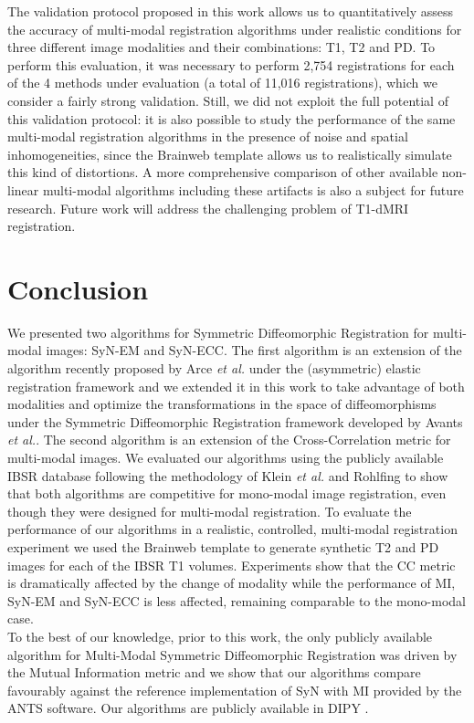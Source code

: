 The validation protocol proposed in this work allows us to quantitatively assess the accuracy of multi-modal registration algorithms under realistic conditions for three different image modalities and their combinations: T1, T2 and PD. To perform this evaluation, it was necessary to perform 2,754 registrations for each of the 4 methods under evaluation (a total of 11,016 registrations), which we consider a fairly strong validation. Still, we did not exploit the full potential of this validation protocol: it is also possible to study the performance of the same multi-modal registration algorithms in the presence of noise and spatial inhomogeneities, since the Brainweb template allows us to realistically simulate this kind of distortions. A more comprehensive comparison of other available non-linear multi-modal algorithms including these artifacts is also a subject for future research. Future work will address the challenging problem of T1-dMRI registration.


\section{Conclusion}
We presented two algorithms for Symmetric Diffeomorphic Registration for multi-modal images: SyN-EM and SyN-ECC. The first algorithm is an extension of the algorithm recently proposed by Arce {\it et al.}\cite{Arce-santana2014} under the (asymmetric) elastic registration framework and we extended it in this work to take advantage of both modalities and optimize the transformations in the space of diffeomorphisms under the Symmetric Diffeomorphic Registration framework developed by Avants {\it et al.}\cite{Avants2008, Avants2011}. The second algorithm is an extension of the Cross-Correlation metric for multi-modal images. We evaluated our algorithms using the publicly available IBSR database following the methodology of Klein {\it et al.}\cite{Klein2009, Klein2010} and Rohlfing \cite{Rohlfing2012} to show that both algorithms are competitive for mono-modal image registration, even though they were designed for multi-modal registration. To evaluate the performance of our algorithms in a realistic, controlled, multi-modal registration experiment we used the Brainweb \citep{Cocosco1997, Kwan1999} template to generate synthetic T2 and PD images for each of the IBSR T1 volumes. Experiments show that the CC metric is dramatically affected by the change of modality while the performance of MI, SyN-EM and SyN-ECC is less affected, remaining comparable to the mono-modal case.\\

To the best of our knowledge, prior to this work, the only publicly available algorithm for Multi-Modal Symmetric Diffeomorphic Registration was driven by the Mutual Information metric and we show that our algorithms compare favourably against the reference implementation of SyN with MI provided by the ANTS software. Our algorithms are publicly available in DIPY \citep{Garyfallidis2014}.
